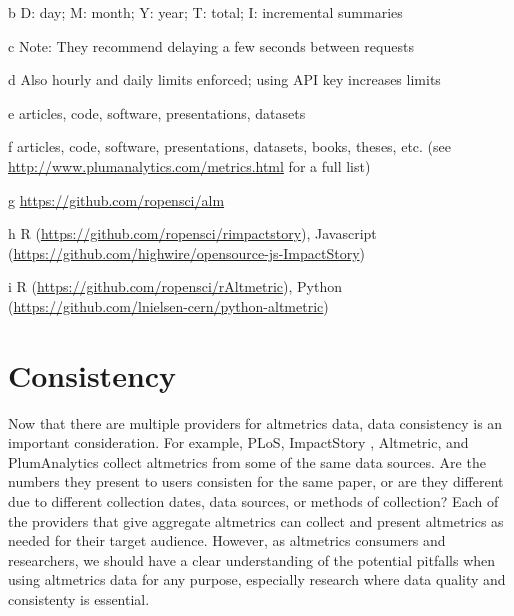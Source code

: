 \documentclass[letterpaper,superscriptaddress,showkeys,longbibliography]{revtex4-1}\usepackage{graphicx, color}
\begin{document}
\begin{table}[!ht]
\begin{threeparttable}[b]
\begin{tablenotes}
            \item[b] D: day; M: month; Y: year; T: total; I: incremental summaries
            \item[c] Note: They recommend delaying a few seconds between requests
            \item[d] Also hourly and daily limits enforced; using API key increases limits
            \item[e] articles, code, software, presentations, datasets
            \item[f] articles, code, software, presentations, datasets, books, theses, etc. (see \url{http://www.plumanalytics.com/metrics.html} for a full list)
            \item[g] \url{https://github.com/ropensci/alm}
            \item[h] R (\url{https://github.com/ropensci/rimpactstory}), Javascript (\url{https://github.com/highwire/opensource-js-ImpactStory})
            \item[i] R (\url{https://github.com/ropensci/rAltmetric}), Python (\url{https://github.com/lnielsen-cern/python-altmetric})
        \end{tablenotes}
    \end{threeparttable}
\end{table}


\section*{Consistency}

Now that there are multiple providers for altmetrics data, data consistency is an important consideration. For example, PLoS, ImpactStory , Altmetric, and PlumAnalytics collect altmetrics from some of the same data sources. Are the numbers they present to users consisten for the same paper, or are they different due to different collection dates, data sources, or methods of collection? Each of the  providers that give aggregate altmetrics can collect and present altmetrics as needed for their target audience. However, as altmetrics consumers and researchers, we should have a clear understanding of the potential pitfalls when using altmetrics data for any purpose, especially research where data quality and consistenty is essential. 
\end{document}
